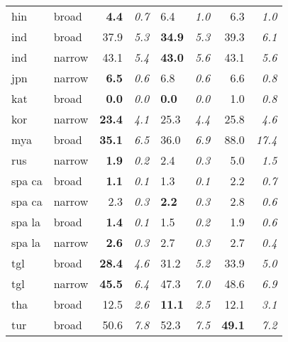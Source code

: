 {\begin{tabularx}{\textwidth}{|l|X||r|r||X|X||r|r|}
hin       & broad         & \textbf{4.4} & \textit{0.7}    & 6.4          & \textit{1.0}          & 6.3    & \textit{1.0}    \\
ind       & broad         & 37.9         & \textit{5.3}    & \textbf{34.9}& \textit{5.3}          & 39.3   & \textit{6.1}    \\
ind       & narrow        & 43.1         & \textit{5.4}    & \textbf{43.0}& \textit{5.6}          & 43.1   & \textit{5.6}    \\
jpn       & narrow        & \textbf{6.5} & \textit{0.6}    & 6.8          & \textit{0.6}          & 6.6    & \textit{0.8}    \\
kat       & broad         & \textbf{0.0} & \textit{0.0}    & \textbf{0.0} & \textit{0.0}          & 1.0    & \textit{0.8}    \\
kor       & narrow        & \textbf{23.4}& \textit{4.1}    & 25.3         & \textit{4.4}          & 25.8   & \textit{4.6}    \\
mya       & broad         & \textbf{35.1}& \textit{6.5}    & 36.0         & \textit{6.9}          & 88.0   & \textit{17.4}   \\
rus       & narrow        & \textbf{1.9} & \textit{0.2}    & 2.4          & \textit{0.3}          & 5.0    & \textit{1.5}    \\
spa ca    & broad         & \textbf{1.1} & \textit{0.1}    & 1.3          & \textit{0.1}          & 2.2    & \textit{0.7}    \\
spa ca    & narrow        & 2.3          & \textit{0.3}    & \textbf{2.2}          & \textit{0.3}          & 2.8    & \textit{0.6}    \\
spa la    & broad         & \textbf{1.4} & \textit{0.1}    & 1.5          & \textit{0.2}          & 1.9    & \textit{0.6}    \\
spa la    & narrow        & \textbf{2.6} & \textit{0.3}    & 2.7          & \textit{0.3}          & 2.7    & \textit{0.4}    \\
tgl       & broad         & \textbf{28.4}& \textit{4.6}    & 31.2         & \textit{5.2}          & 33.9   & \textit{5.0}    \\
tgl       & narrow        & \textbf{45.5}& \textit{6.4}    & 47.3         & \textit{7.0}          & 48.6   & \textit{6.9}    \\
tha       & broad         & 12.5         & \textit{2.6}    & \textbf{11.1}         & \textit{2.5}          & 12.1   & \textit{3.1}    \\
tur       & broad         & 50.6         & \textit{7.8}    & 52.3         & \textit{7.5}          & \textbf{49.1}   & \textit{7.2}    \\

\end{tabularx}}
